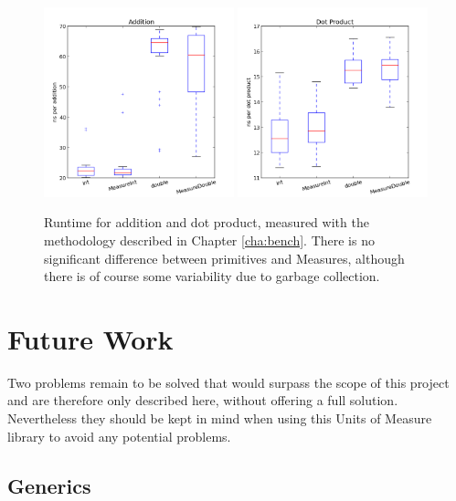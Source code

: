 \documentclass[12pt,oneside,a4paper]{scrbook}
\begin{document}
\begin{figure}[htb]
\centering
\includegraphics[width=0.49\textwidth]{boxplot_add.png}
\includegraphics[width=0.49\textwidth]{boxplot_mul.png}
\caption{Runtime for addition and dot product, measured with the methodology described in Chapter \ref{cha:bench}. There is no significant difference between primitives and Measures, although there is of course some variability due to garbage collection.}
\label{fig:rome}
\end{figure}




\chapter{Future Work}
\label{cha:future}

Two problems remain to be solved that would surpass the scope of this project and are therefore only described here, without offering a full solution. Nevertheless they should be kept in mind when using this Units of Measure library to avoid any potential problems.

\section{Generics}
\end{document}
